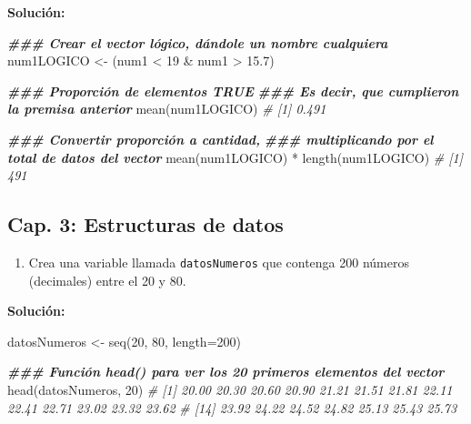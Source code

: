 \documentclass[
]{article}
\newenvironment{Shaded}{\begin{snugshade}}{\end{snugshade}}
\newcommand{\AttributeTok}[1]{\textcolor[rgb]{0.77,0.63,0.00}{#1}}
\newcommand{\CommentTok}[1]{\textcolor[rgb]{0.56,0.35,0.01}{\textit{#1}}}
\newcommand{\DecValTok}[1]{\textcolor[rgb]{0.00,0.00,0.81}{#1}}
\newcommand{\DocumentationTok}[1]{\textcolor[rgb]{0.56,0.35,0.01}{\textbf{\textit{#1}}}}
\newcommand{\FloatTok}[1]{\textcolor[rgb]{0.00,0.00,0.81}{#1}}
\newcommand{\FunctionTok}[1]{\textcolor[rgb]{0.00,0.00,0.00}{#1}}
\newcommand{\NormalTok}[1]{#1}
\newcommand{\OtherTok}[1]{\textcolor[rgb]{0.56,0.35,0.01}{#1}}
\newcommand{\SpecialCharTok}[1]{\textcolor[rgb]{0.00,0.00,0.00}{#1}}
\providecommand{\tightlist}{%
  \setlength{\itemsep}{0pt}\setlength{\parskip}{0pt}}
\theoremstyle{definition}
\theoremstyle{definition}
\theoremstyle{definition}
\theoremstyle{definition}
\theoremstyle{remark}
\begin{document}
\textbf{Solución:}

\begin{Shaded}
\begin{Highlighting}[]
\DocumentationTok{\#\#\# Crear el vector lógico, dándole un nombre cualquiera}
\NormalTok{num1LOGICO }\OtherTok{\textless{}{-}}\NormalTok{ (num1 }\SpecialCharTok{\textless{}} \DecValTok{19} \SpecialCharTok{\&}\NormalTok{ num1 }\SpecialCharTok{\textgreater{}} \FloatTok{15.7}\NormalTok{)}

\DocumentationTok{\#\#\# Proporción de elementos TRUE}
\DocumentationTok{\#\#\# Es decir, que cumplieron la premisa anterior}
\FunctionTok{mean}\NormalTok{(num1LOGICO)}
\CommentTok{\# [1] 0.491}

\DocumentationTok{\#\#\# Convertir proporción a cantidad,}
\DocumentationTok{\#\#\# multiplicando por el total de datos del vector}
\FunctionTok{mean}\NormalTok{(num1LOGICO) }\SpecialCharTok{*} \FunctionTok{length}\NormalTok{(num1LOGICO)}
\CommentTok{\# [1] 491}
\end{Highlighting}
\end{Shaded}

\hypertarget{preg-estructurasdatos}{%
\subsection{Cap. 3: Estructuras de datos}\label{preg-estructurasdatos}}

\begin{enumerate}
\def\labelenumi{\arabic{enumi}.}
\tightlist
\item
  Crea una variable llamada \texttt{datosNumeros} que contenga 200 números (decimales) entre el 20 y 80.
\end{enumerate}

\textbf{Solución:}

\begin{Shaded}
\begin{Highlighting}[]
\NormalTok{datosNumeros }\OtherTok{\textless{}{-}} \FunctionTok{seq}\NormalTok{(}\DecValTok{20}\NormalTok{, }\DecValTok{80}\NormalTok{, }\AttributeTok{length=}\DecValTok{200}\NormalTok{)}

\DocumentationTok{\#\#\# Función head() para ver los 20 primeros elementos del vector}
\FunctionTok{head}\NormalTok{(datosNumeros, }\DecValTok{20}\NormalTok{)}
\CommentTok{\#  [1] 20.00 20.30 20.60 20.90 21.21 21.51 21.81 22.11 22.41 22.71 23.02 23.32 23.62}
\CommentTok{\# [14] 23.92 24.22 24.52 24.82 25.13 25.43 25.73}
\end{Highlighting}
\end{Shaded}
\end{document}
